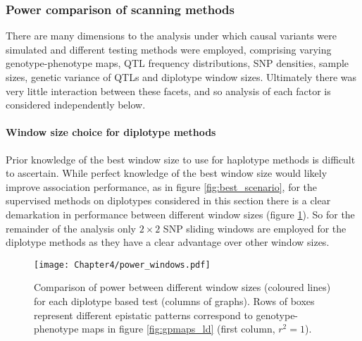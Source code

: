 \subsubsection{Power comparison of scanning methods}


There are many dimensions to the analysis under which causal variants were simulated and different testing methods were employed, comprising varying genotype-phenotype maps, QTL frequency distributions, SNP densities, sample sizes, genetic variance of QTLs and diplotype window sizes. Ultimately there was very little interaction between these facets, and so analysis of each factor is considered independently below.

\paragraph{Window size choice for diplotype methods}
Prior knowledge of the best window size to use for haplotype methods is difficult to ascertain. While perfect knowledge of the best window size would likely improve association performance, as in figure \ref{fig:best_scenario}, for the supervised methods on diplotypes considered in this section there is a clear demarkation in performance between different window sizes (figure \ref{fig:power_windows}). So for the remainder of the analysis only $2 \times 2$ SNP sliding windows are employed for the diplotype methods as they have a clear advantage over other window sizes.


\begin{figure}
\begin{center}
\begin{center}
\texttt{[image: Chapter4/power\_windows.pdf]}
\caption[Effect of window size on power of supervised methods]{Comparison of power between different window sizes (coloured lines) for each diplotype based test (columns of graphs). Rows of boxes represent different epistatic patterns correspond to genotype-phenotype maps in figure \ref{fig:gpmaps_ld} (first column, $r^2 = 1$).
\label{fig:power_windows}}
\end{center}
\end{center}
\end{figure}



